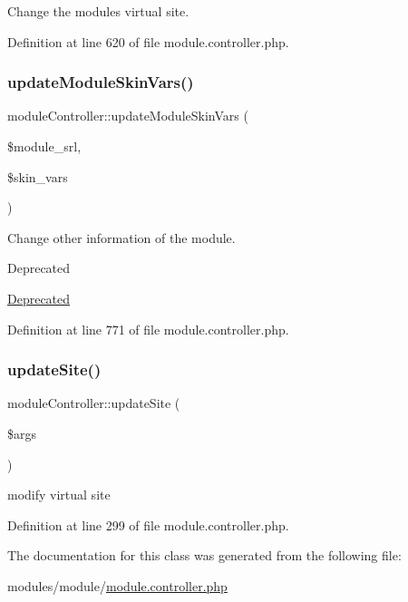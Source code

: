 Change the module\textquotesingle{}s virtual site. 



Definition at line 620 of file module.\+controller.\+php.

\hypertarget{classmoduleController_aa877238508d8cde2ad00f40b8ff283c0}{}\label{classmoduleController_aa877238508d8cde2ad00f40b8ff283c0} 
\subsubsection{\texorpdfstring{update\+Module\+Skin\+Vars()}{updateModuleSkinVars()}}
{\footnotesize\ttfamily module\+Controller\+::update\+Module\+Skin\+Vars (\begin{DoxyParamCaption}\item[{}]{\$module\+\_\+srl,  }\item[{}]{\$skin\+\_\+vars }\end{DoxyParamCaption})}



Change other information of the module. 

\begin{DoxyRefDesc}{Deprecated}
\item[\hyperlink{deprecated__deprecated000026}{Deprecated}]\end{DoxyRefDesc}


Definition at line 771 of file module.\+controller.\+php.

\hypertarget{classmoduleController_ae2fb61c8a558f0552202c51d2055eede}{}\label{classmoduleController_ae2fb61c8a558f0552202c51d2055eede} 
\subsubsection{\texorpdfstring{update\+Site()}{updateSite()}}
{\footnotesize\ttfamily module\+Controller\+::update\+Site (\begin{DoxyParamCaption}\item[{}]{\$args }\end{DoxyParamCaption})}



modify virtual site 



Definition at line 299 of file module.\+controller.\+php.



The documentation for this class was generated from the following file\+:\begin{DoxyCompactItemize}
\item 
modules/module/\hyperlink{module_8controller_8php}{module.\+controller.\+php}\end{DoxyCompactItemize}
